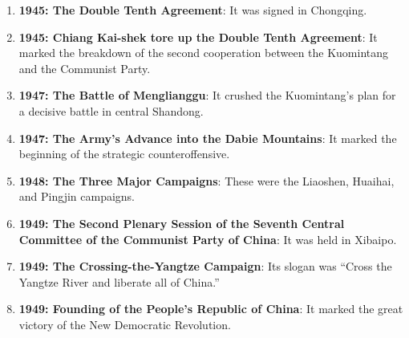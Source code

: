 \documentclass[12pt,a4paper]{ctexart}
\begin{document}
\begin{enumerate}[leftmargin=2em]
    \item \textbf{1945: The Double Tenth Agreement}: It was signed in Chongqing.
    \item \textbf{1945: Chiang Kai-shek tore up the Double Tenth Agreement}: It marked the breakdown of the second cooperation between the Kuomintang and the Communist Party.
    \item \textbf{1947: The Battle of Menglianggu}: It crushed the Kuomintang's plan for a decisive battle in central Shandong.
    \item \textbf{1947: The Army's Advance into the Dabie Mountains}: It marked the beginning of the strategic counteroffensive.
    \item \textbf{1948: The Three Major Campaigns}: These were the Liaoshen, Huaihai, and Pingjin campaigns.
    \item \textbf{1949: The Second Plenary Session of the Seventh Central Committee of the Communist Party of China}: It was held in Xibaipo.
    \item \textbf{1949: The Crossing-the-Yangtze Campaign}: Its slogan was ``Cross the Yangtze River and liberate all of China.''
    \item \textbf{1949: Founding of the People's Republic of China}: It marked the great victory of the New Democratic Revolution.
\end{enumerate}
\end{document}
